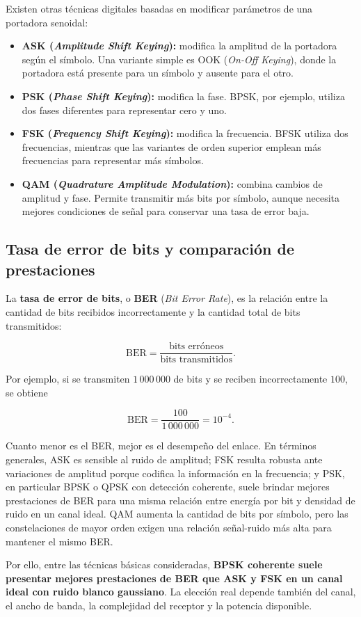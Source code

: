 \documentclass[12pt,a4paper]{article}
\begin{document}
Existen otras técnicas digitales basadas en modificar parámetros de una
portadora senoidal:

\begin{itemize}
  \item \textbf{ASK (\emph{Amplitude Shift Keying}):} modifica la amplitud de la
  portadora según el símbolo. Una variante simple es OOK (\emph{On-Off
  Keying}), donde la portadora está presente para un símbolo y ausente para el
  otro.

  \item \textbf{PSK (\emph{Phase Shift Keying}):} modifica la fase. BPSK, por
  ejemplo, utiliza dos fases diferentes para representar cero y uno.

  \item \textbf{FSK (\emph{Frequency Shift Keying}):} modifica la frecuencia.
  BFSK utiliza dos frecuencias, mientras que las variantes de orden superior
  emplean más frecuencias para representar más símbolos.

  \item \textbf{QAM (\emph{Quadrature Amplitude Modulation}):} combina cambios
  de amplitud y fase. Permite transmitir más bits por símbolo, aunque necesita
  mejores condiciones de señal para conservar una tasa de error baja.
\end{itemize}

\subsection{Tasa de error de bits y comparación de prestaciones}

La \textbf{tasa de error de bits}, o \textbf{BER} (\emph{Bit Error Rate}), es
la relación entre la cantidad de bits recibidos incorrectamente y la cantidad
total de bits transmitidos:

\[
\mathrm{BER}=\frac{\text{bits erróneos}}{\text{bits transmitidos}}.
\]

Por ejemplo, si se transmiten $1\,000\,000$ de bits y se reciben incorrectamente
$100$, se obtiene

\[
\mathrm{BER}=\frac{100}{1\,000\,000}=10^{-4}.
\]

Cuanto menor es el BER, mejor es el desempeño del enlace. En términos
generales, ASK es sensible al ruido de amplitud; FSK resulta robusta ante
variaciones de amplitud porque codifica la información en la frecuencia; y PSK,
en particular BPSK o QPSK con detección coherente, suele brindar mejores
prestaciones de BER para una misma relación entre energía por bit y densidad de
ruido en un canal ideal. QAM aumenta la cantidad de bits por símbolo, pero las
constelaciones de mayor orden exigen una relación señal-ruido más alta para
mantener el mismo BER.

Por ello, entre las técnicas básicas consideradas, \textbf{BPSK coherente suele
presentar mejores prestaciones de BER que ASK y FSK en un canal ideal con ruido
blanco gaussiano}. La elección real depende también del canal, el ancho de banda,
la complejidad del receptor y la potencia disponible.
\end{document}
